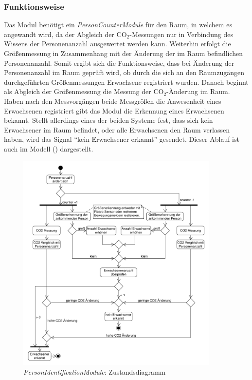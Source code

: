 \subsubsection{Funktionsweise}
Das Modul benötigt ein \emph{PersonCounterModule} für den Raum, in welchem es angewandt wird, da der Abgleich der CO$_2$-Messungen nur in Verbindung des Wissens der Personenanzahl ausgewertet werden kann. Weiterhin erfolgt die Größenmessung in Zusammenhang mit der Änderung der im Raum befindlichen Personenanzahl. Somit ergibt sich die Funktionsweise, dass bei Änderung der Personenanzahl im Raum geprüft wird, ob durch die sich an den Raumzugängen durchgeführten Größenmessungen Erwachsene registriert wurden. Danach beginnt als Abgleich der Größenmessung die Messung der CO$_2$-Änderung im Raum. Haben nach den Messvorgängen beide Messgrößen die Anwesenheit eines Erwachsenen registriert gibt das Modul die Erkennung eines Erwachsenen bekannt. Stellt  allerdings eines der beiden Systeme fest, dass sich kein Erwachsener im Raum befindet, oder alle Erwachsenen den Raum verlassen haben, wird das Signal "`kein Erwachsener erkannt"' gesendet. Dieser Ablauf ist auch im Modell () dargestellt.

\newpage

\begin{figure}[h!]
	\centering
	\includegraphics[width=0.9\textwidth]{img/Modulkonzeption/PersonIdentificationStateMachine.pdf}
	\caption{\emph{PersonIdentificationModule}: Zustandsdiagramm}
	\label{fig:personIdentification}
\end{figure}

